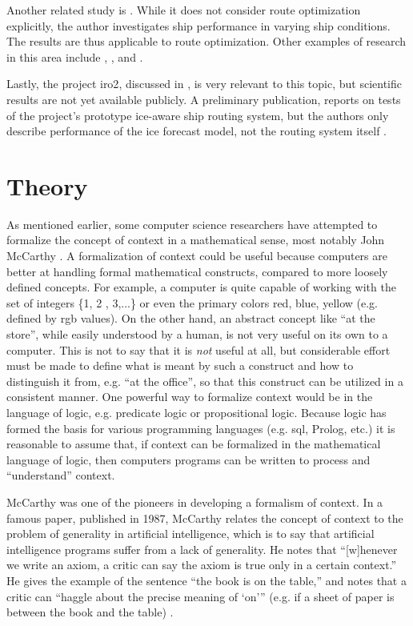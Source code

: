Another related study is \cite{esa2015fuel}. While it does not consider route optimization explicitly, the author investigates ship performance in varying ship conditions. The results are thus applicable to route optimization. Other examples of research in this area include \cite{montewka2015towards}, \cite{laprairie1995transit}, and \cite{valanto2001resistance}.

Lastly, the project \gls{iro2}, discussed in \cite{fock2012}, is very relevant to this topic, but scientific results are not yet available publicly. A preliminary publication, reports on tests of the project's prototype ice-aware ship routing system, but the authors only describe performance of the ice forecast model, not the routing system itself \cite{dobrynin2015prediction}.



\section{Theory}
\label{sec:theory}

As mentioned earlier, some computer science researchers have attempted to formalize the concept of context in a mathematical sense, most notably John McCarthy \cite{McCarthy1993} \cite{mccarthy1997formalizing}. A formalization of context could be useful because computers are better at handling formal mathematical constructs, compared to more loosely defined concepts. For example, a computer is quite capable of working with the set of integers \{1, 2 , 3,...\} or even the primary colors {red, blue, yellow} (e.g. defined by \acrshort{rgb} values). On the other hand, an abstract concept like ``at the store'', while easily understood by a human, is not very useful on its own to a computer. This is not to say that it is \emph{not} useful at all, but considerable effort must be made to define what is meant by such a construct and how to distinguish it from, e.g. ``at the office'', so that this construct can be utilized in a consistent manner. One powerful way to formalize context would be in the language of logic, e.g. predicate logic or propositional logic. Because logic has formed the basis for various programming languages (e.g. \acrshort{sql}, Prolog, etc.) it is reasonable to assume that, if context can be formalized in the mathematical language of logic, then computers programs can be written to process and ``understand'' context.

McCarthy was one of the pioneers in developing a formalism of context. In a famous paper, published in 1987, McCarthy relates the concept of context to the problem of generality in artificial intelligence, which is to say that artificial intelligence programs suffer from a lack of generality. He notes that ``[w]henever we write an axiom, a critic can say the axiom is true only in a certain context.'' He gives the example of the sentence ``the book is on the table,'' and notes that a critic can ``haggle about the precise meaning of `on'\thinspace'' (e.g. if a sheet of paper is between the book and the table) \cite{mccarthy1987generality}. 

